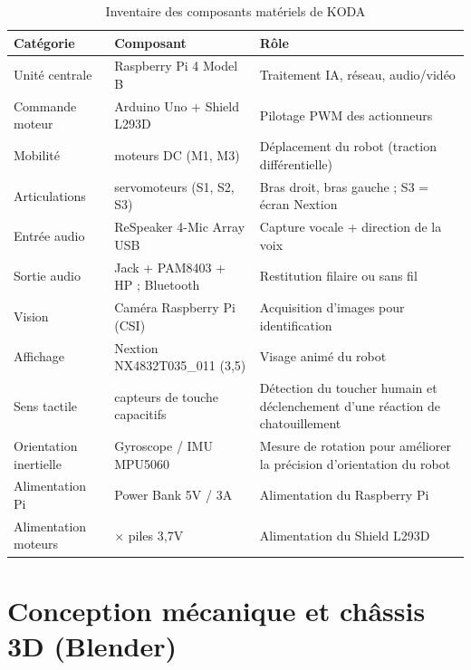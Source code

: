 \documentclass[a4paper,12pt]{report}
\begin{document}
	\begin{table}[htbp]
		\centering
		\caption{Inventaire des composants matériels de KODA}
		\label{tab:composants_cycle3}
		\renewcommand{\arraystretch}{1.25}
		\begin{tabularx}{\textwidth}{|>{\raggedright\arraybackslash}p{3.5cm}|>{\raggedright\arraybackslash}p{4cm}|>{\raggedright\arraybackslash}X|}
			\hline
			\textbf{Catégorie} & \textbf{Composant} & \textbf{Rôle} \\
			\hline
			Unité centrale & Raspberry Pi 4 Model B & Traitement IA, réseau, audio/vidéo \\
			\hline
			Commande moteur & Arduino Uno + Shield L293D & Pilotage PWM des actionneurs \\
			\hline
			Mobilité & 2 moteurs DC (M1, M3) & Déplacement du robot (traction différentielle) \\
			\hline
			Articulations & 3 servomoteurs (S1, S2, S3) & Bras droit, bras gauche ; S3 = écran Nextion \\
			\hline
			Entrée audio & ReSpeaker 4-Mic Array USB & Capture vocale + direction de la voix \\
			\hline
			Sortie audio & Jack + PAM8403 + HP ; Bluetooth & Restitution filaire ou sans fil \\
			\hline
			Vision & Caméra Raspberry Pi (CSI) & Acquisition d'images pour identification \\
			\hline
			Affichage & Nextion NX4832T035\_011 (3{,}5\textquotedbl) & Visage animé du robot \\
			\hline
			Sens tactile & 2 capteurs de touche capacitifs & Détection du toucher humain et déclenchement d'une réaction de chatouillement \\
			\hline
			Orientation inertielle & Gyroscope / IMU MPU5060 & Mesure de rotation pour améliorer la précision d'orientation du robot \\
			\hline
			Alimentation Pi & Power Bank 5V / 3A & Alimentation du Raspberry Pi \\
			\hline
			Alimentation moteurs & 3$\times$ piles 3{,}7V & Alimentation du Shield L293D \\
			\hline
		\end{tabularx}
	\end{table}
	
	\section{Conception mécanique et châssis 3D (Blender)}
	
\end{document}
